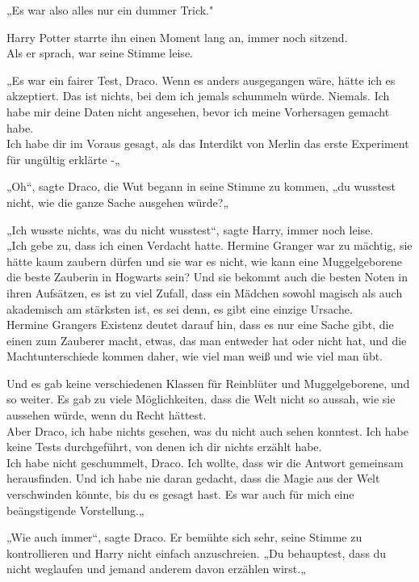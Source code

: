 {„Es war also alles nur ein dummer Trick."

Harry Potter starrte ihn einen Moment lang an, immer noch sitzend.\\ Als er sprach, war seine Stimme leise.

„Es war ein fairer Test, Draco. Wenn es anders ausgegangen wäre, hätte ich es akzeptiert. Das ist nichts, bei dem ich jemals schummeln würde. Niemals. Ich habe mir deine Daten nicht angesehen, bevor ich meine Vorhersagen gemacht habe.\\ Ich habe dir im Voraus gesagt, als das Interdikt von Merlin das erste Experiment für ungültig erklärte -„

„Oh“, sagte Draco, die Wut begann in seine Stimme zu kommen, „du wusstest nicht, wie die ganze Sache ausgehen würde?„

„Ich wusste nichts, was du nicht wusstest“, sagte Harry, immer noch leise.\\ „Ich gebe zu, dass ich einen Verdacht hatte. Hermine Granger war zu mächtig, sie hätte kaum zaubern dürfen und sie war es nicht, wie kann eine Muggelgeborene die beste Zauberin in Hogwarts sein? Und sie bekommt auch die besten Noten in ihren Aufsätzen, es ist zu viel Zufall, dass ein Mädchen sowohl magisch als auch akademisch am stärksten ist, es sei denn, es gibt eine einzige Ursache.\\ Hermine Grangers Existenz deutet darauf hin, dass es nur eine Sache gibt, die einen zum Zauberer macht, etwas, das man entweder hat oder nicht hat, und die Machtunterschiede kommen daher, wie viel man weiß und wie viel man übt.

Und es gab keine verschiedenen Klassen für Reinblüter und Muggelgeborene, und so weiter. Es gab zu viele Möglichkeiten, dass die Welt nicht so aussah, wie sie aussehen würde, wenn du Recht hättest.\\ Aber Draco, ich habe nichts gesehen, was du nicht auch sehen konntest. Ich habe keine Tests durchgeführt, von denen ich dir nichts erzählt habe.\\ Ich habe nicht geschummelt, Draco. Ich wollte, dass wir die Antwort gemeinsam herausfinden. Und ich habe nie daran gedacht, dass die Magie aus der Welt verschwinden könnte, bis du es gesagt hast. Es war auch für mich eine beängstigende Vorstellung.„

„Wie auch immer“, sagte Draco. Er bemühte sich sehr, seine Stimme zu kontrollieren und Harry nicht einfach anzuschreien. „Du behauptest, dass du nicht weglaufen und jemand anderem davon erzählen wirst.„

}
